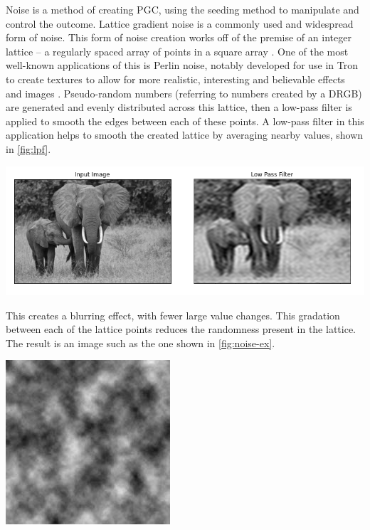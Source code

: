 \documentclass[10pt]{report}
\begin{document}
		Noise is a method of creating PGC, using the seeding method to manipulate and control the outcome. Lattice gradient noise is a commonly used and widespread form of noise. This form of noise creation works off of the premise of an integer lattice -- a regularly spaced array of points in a square array \cite{integer-lattice}. One of the most well-known applications of this is Perlin noise, notably developed for use in Tron \cite{tron} to create textures to allow for more realistic, interesting and believable effects and images \cite{ken-perlin}. Pseudo-random numbers (referring to numbers created by a DRGB) are generated and evenly distributed across this lattice, then a low-pass filter is applied to smooth the edges between each of these points. A low-pass filter in this application helps to smooth the created lattice by averaging nearby values, shown in \autoref{fig:lpf}. 
		
		\begin{minipage}{\textwidth}
			\centering
			\includegraphics[scale=0.5]{lowpass}
			\label{fig:lpf}
		\end{minipage}
		
		This creates a blurring effect, with fewer large value changes. This gradation between each of the lattice points reduces the randomness present in the lattice. The result is an image such as the one shown in \autoref{fig:noise-ex}.
		
		\begin{minipage}{\textwidth}
			\centering
			\includegraphics[scale=1]{lect14-perlin}
			\label{fig:noise-ex}
		\end{minipage}
\end{document}

